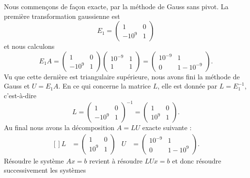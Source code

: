 \begin{example}     \label{ExooNTECooXvTcoh}
	Nous commençons de façon exacte, par la méthode de Gauss sans pivot. La première transformation gaussienne est
	\begin{equation}
		E_1=\begin{pmatrix}
			1     & 0 \\
			-10^9 & 1
		\end{pmatrix}
	\end{equation}
	et nous calculons
	\begin{equation}
		E_1A=\begin{pmatrix}
			1     & 0 \\
			-10^9 & 1
		\end{pmatrix}\begin{pmatrix}
			10^{-9} & 1 \\
			1       & 1
		\end{pmatrix}=
		\begin{pmatrix}
			10^{-9} & 1         \\
			0       & 1-10^{-9}
		\end{pmatrix}.
	\end{equation}
	Vu que cette dernière est triangulaire supérieure, nous avons fini la méthode de Gauss et \( U=E_1A\). En ce qui concerne la matrice \( L\), elle est donnée par \( L=E_1^{-1}\), c'est-à-dire
	\begin{equation}
		L=\begin{pmatrix}
			1     & 0 \\
			-10^9 & 1
		\end{pmatrix}^{-1}=
		\begin{pmatrix}
			1    & 0 \\
			10^9 & 1
		\end{pmatrix}.
	\end{equation}
	Au final nous avons la décomposition \( A=LU\) exacte suivante :
	\begin{equation}
		\begin{aligned}[]
			L & =\begin{pmatrix}
				1    & 0 \\
				10^9 & 1
			\end{pmatrix} & U & =\begin{pmatrix}
				10^{-9} & 1      \\
				0       & 1-10^9
			\end{pmatrix}.
		\end{aligned}
	\end{equation}
	Résoudre le système \( Ax=b\) revient à résoudre \( LUx=b\) et donc résoudre successivement les systèmes

\end{example}
